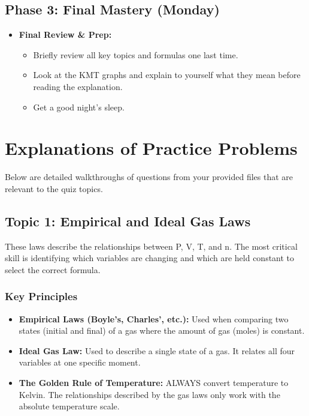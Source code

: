 \documentclass{article}
\begin{document}
\subsection{Phase 3: Final Mastery (Monday)}
\begin{itemize}
    \item \textbf{Final Review \& Prep:}
        \begin{itemize}
            \item Briefly review all key topics and formulas one last time.
            \item Look at the KMT graphs and explain to yourself what they mean before reading the explanation.
            \item Get a good night's sleep.
        \end{itemize}
\end{itemize}

\section{Explanations of Practice Problems}
Below are detailed walkthroughs of questions from your provided files that are relevant to the quiz topics.

\subsection{Topic 1: Empirical and Ideal Gas Laws}
These laws describe the relationships between P, V, T, and n. The most critical skill is identifying which variables are changing and which are held constant to select the correct formula.

\subsubsection{Key Principles}
\begin{itemize}
    \item \textbf{Empirical Laws (Boyle's, Charles', etc.):} Used when comparing two states (initial and final) of a gas where the amount of gas (moles) is constant.
    \item \textbf{Ideal Gas Law:} Used to describe a single state of a gas. It relates all four variables at one specific moment.
    \item \textbf{The Golden Rule of Temperature:} ALWAYS convert temperature to Kelvin. The relationships described by the gas laws only work with the absolute temperature scale.
\end{itemize}
\end{document}
